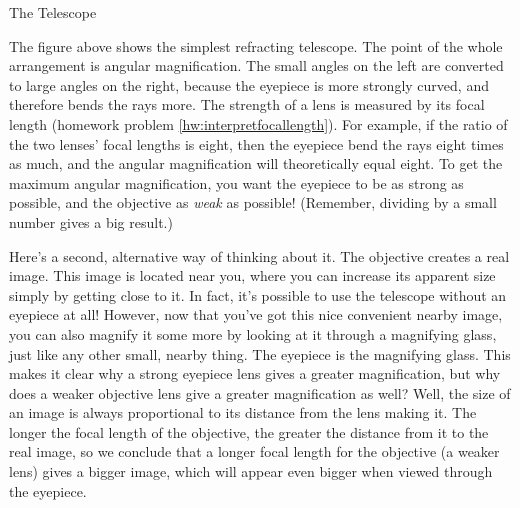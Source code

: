 \begin{lab}{The Telescope}

\vfill\pagebreak[4]

The figure above
shows the simplest refracting telescope.
The point of the whole arrangement is angular magnification.
The small angles on the left are converted to large angles
on the right, because the eyepiece is more strongly curved,
and therefore bends the rays more. The strength of a lens
is measured by its focal length (homework problem
\ref{hw:interpretfocallength}).
For example, if the ratio of the two lenses' focal
lengths is eight, then the eyepiece
bend the rays eight times as much, and the angular magnification
will theoretically equal eight. To get the maximum angular magnification,
you want the eyepiece to be as strong as possible, and the objective
as \emph{weak} as possible! (Remember, dividing by a small number gives
a big result.)

Here's a second, alternative way of thinking about it. The objective
creates a real image. This image is located near you, where you can increase
its apparent size simply by getting close to it. In fact, it's possible to
use the telescope without an eyepiece at all! However, now that you've got
this nice convenient nearby image, you can also magnify it some more by
looking at it through a magnifying glass, just like any other small, nearby
thing. The eyepiece is the magnifying glass. This makes it clear why a strong
eyepiece lens gives a greater magnification, but why does a weaker objective
lens give a greater magnification as well? Well, the size of an image is always
proportional to its distance from the lens making it. The longer the focal length
of the objective, the greater the distance from it to the real image, so we conclude
that a longer focal length for the objective (a weaker lens) gives a bigger image,
which will appear even bigger when viewed through the eyepiece.


\end{lab}

